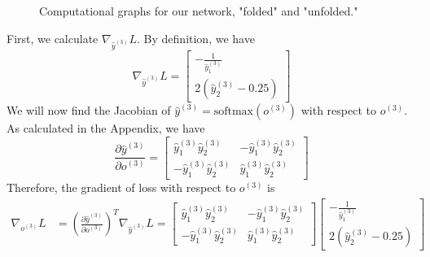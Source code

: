 \documentclass[
	12pt, %
]{../Template/fphw}
\begin{document}
\begin{enumerate}[label=(\arabic*)]
\begin{figure}[!htbp]
        \caption{Computational graphs for our network, "folded" and "unfolded."}
        \label{fig:comp_graph_rnn}
    \end{figure}
First, we calculate $\nabla_{\hat{y}^{(3)}}{L}$. By definition, we have
\begin{equation}
    \nabla_{\hat{y}^{(3)}}{L} =\begin{bmatrix}
         -\frac{1}{\hat{y}_{1}^{(3)}} \\ 2(\hat{y}_{2}^{(3)}-0.25) 
    \end{bmatrix}
\end{equation}
We will now find the Jacobian of $\hat{y}^{(3)} = \textrm{softmax}(o^{(3)})$ with respect to $o^{(3)}$. As calculated in the Appendix, we have
\begin{equation}
    \frac{\partial \hat{y}^{(3)}}{\partial o^{(3)}} = \begin{bmatrix}
        \hat{y}^{(3)}_{1}\hat{y}^{(3)}_{2} & -\hat{y}^{(3)}_{1}\hat{y}^{(3)}_{2} \\ -\hat{y}^{(3)}_{1}\hat{y}^{(3)}_{2} &\hat{y}^{(3)}_{1}\hat{y}^{(3)}_{2}
    \end{bmatrix}
\end{equation}
Therefore, the gradient of loss with respect to $o^{(3)}$ is
\begin{align}
    \nabla_{o^{(3)}}L &= \left(\frac{\partial \hat{y}^{(3)}}{\partial o^{(3)}}\right)^T \nabla_{\hat{y}^{(3)}}L = \begin{bmatrix}
        \hat{y}^{(3)}_{1}\hat{y}^{(3)}_{2} & -\hat{y}^{(3)}_{1}\hat{y}^{(3)}_{2} \\ -\hat{y}^{(3)}_{1}\hat{y}^{(3)}_{2} &\hat{y}^{(3)}_{1}\hat{y}^{(3)}_{2}
    \end{bmatrix}
    \begin{bmatrix}
         -\frac{1}{\hat{y}_{1}^{(3)}} \\ 2(\hat{y}_{2}^{(3)}-0.25) 

\end{bmatrix}
\end{align}
\end{enumerate}
\end{document}
